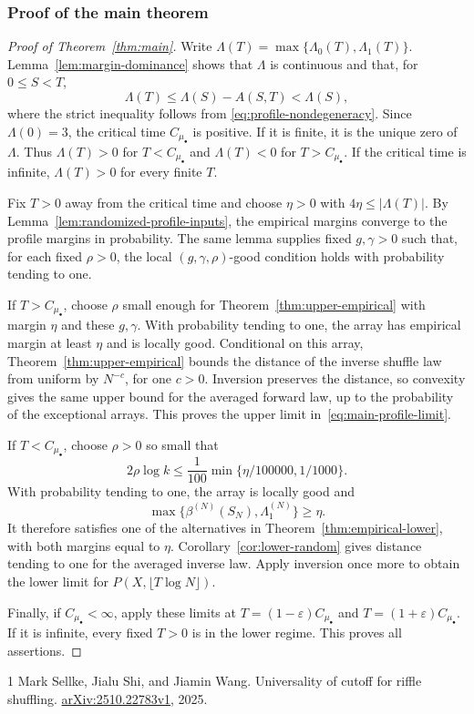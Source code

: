 \documentclass[11pt]{article}
\numberwithin{equation}{section}
\theoremstyle{definition}
\theoremstyle{remark}
\newcommand{\1}{\mathbf 1}
\begin{document}
\subsubsection{Proof of the main theorem}

\begin{proof}[Proof of Theorem~\ref{thm:main}]
Write $\Lambda(T)=\max\{\Lambda_0(T),\Lambda_1(T)\}$.
Lemma~\ref{lem:margin-dominance} shows that $\Lambda$ is continuous and
that, for $0\le S<T$,
\[
 \Lambda(T)\le\Lambda(S)-A(S,T)<\Lambda(S),
\]
where the strict inequality follows from
\eqref{eq:profile-nondegeneracy}. Since $\Lambda(0)=3$, the critical
time $C_{\mu_\bullet}$ is positive. If it is finite, it is the unique
zero of $\Lambda$. Thus $\Lambda(T)>0$ for $T<C_{\mu_\bullet}$ and
$\Lambda(T)<0$ for $T>C_{\mu_\bullet}$. If the critical time is
infinite, $\Lambda(T)>0$ for every finite $T$.

Fix $T>0$ away from the critical time and choose $\eta>0$ with
$4\eta\le|\Lambda(T)|$. By
Lemma~\ref{lem:randomized-profile-inputs}, the empirical margins
converge to the profile margins in probability. The same lemma supplies
fixed $g,\gamma>0$ such that, for each fixed $\rho>0$, the local
$(g,\gamma,\rho)$-good condition holds with probability tending to one.

If $T>C_{\mu_\bullet}$, choose $\rho$ small enough for
Theorem~\ref{thm:upper-empirical} with margin $\eta$ and these
$g,\gamma$. With probability tending to one, the array has empirical
margin at least $\eta$ and is locally good. Conditional on this array,
Theorem~\ref{thm:upper-empirical} bounds the distance of the inverse
shuffle law from uniform by $N^{-c}$, for one $c>0$. Inversion preserves
the distance, so convexity gives the same upper bound for the averaged
forward law, up to the probability of the exceptional arrays. This
proves the upper limit in~\eqref{eq:main-profile-limit}.

If $T<C_{\mu_\bullet}$, choose $\rho>0$ so small that
\[
 2\rho\log k\le\frac1{100}\min\{\eta/100000,1/1000\}.
\]
With probability tending to one, the array is locally good and
\[
 \max\{\beta^{(N)}(S_N),\Lambda_1^{(N)}\}\ge\eta.
\]
It therefore satisfies one of the alternatives in
Theorem~\ref{thm:empirical-lower}, with both margins equal to $\eta$.
Corollary~\ref{cor:lower-random} gives distance tending to one for
the averaged inverse law. Apply inversion once more to obtain the
lower limit for $P(X,\lfloor T\log N\rfloor)$.

Finally, if $C_{\mu_\bullet}<\infty$, apply these limits at
$T=(1-\varepsilon)C_{\mu_\bullet}$ and
$T=(1+\varepsilon)C_{\mu_\bullet}$. If it is infinite, every fixed
$T>0$ is in the lower regime. This proves all assertions.
\end{proof}



\begin{thebibliography}{1}
Mark Sellke, Jialu Shi, and Jiamin Wang.
\newblock Universality of cutoff for riffle shuffling.
\newblock \href{https://arxiv.org/abs/2510.22783v1}{arXiv:2510.22783v1}, 2025.
\end{thebibliography}
\end{document}
